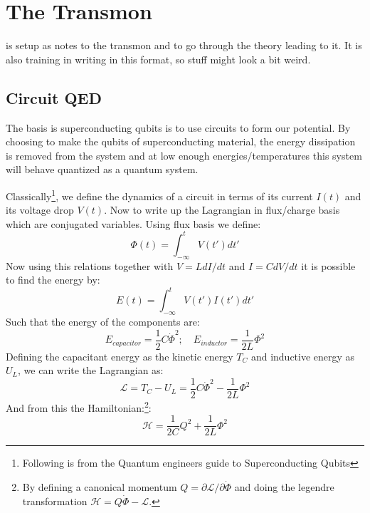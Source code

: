 \chapter{The Transmon}
 is setup as notes to the transmon and to go through the theory leading to it. It is also training in writing in this format, so stuff might look a bit weird. 

\section{Circuit QED}
The basis is superconducting qubits is to use circuits to form our potential. By choosing to make the qubits of superconducting material, the energy dissipation is removed from the system and at low enough energies/temperatures this system will behave quantized as a quantum system. 

Classically\footnote{Following is from the Quantum engineers guide to Superconducting Qubits}, we define the dynamics of a circuit in terms of its current $I(t)$ and its voltage drop $V(t)$. Now to write up the Lagrangian in flux/charge basis which are conjugated variables. Using flux basis we define:
\begin{equation}
    \Phi (t) = \int_{-\infty}^t V(t')dt'
\end{equation}
Now using this relations together with $V = L dI/dt$ and $I = C dV/dt$ it is possible to find the energy by:
\begin{equation}\label{eq: Energy from current and voltage}
    E(t) = \int_{-\infty}^t V(t')I(t')dt'
\end{equation}
Such that the energy of the components are:
\begin{equation}
    E_{capacitor} = \frac12 C \dot{\Phi}^2; \quad E_{inductor} = \frac{1}{2L} \Phi^2
\end{equation}
Defining the capacitant energy as the kinetic energy $T_C$ and inductive energy as $U_L$, we can write the Lagrangian as:
\begin{equation}
    \mathcal{L} = T_C - U_L = \frac12 C \dot{\Phi}^2 - \frac{1}{2L} \Phi^2
\end{equation}
And from this the Hamiltonian:\footnote{By defining a canonical momentum $Q = \partial \mathcal{L} / \partial \dot{\Phi}$ and doing the legendre transformation $\mathcal{H} = Q\dot{\Phi} - \mathcal{L}$.}:
\begin{equation}
    \mathcal{H} = \frac{1}{2C} Q^2 + \frac{1}{2L} \Phi^2
\end{equation}


